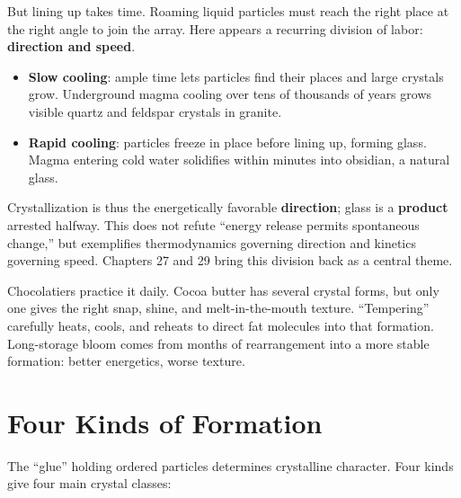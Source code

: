 But lining up takes time. Roaming liquid particles must reach the right place at the right angle to join the array. Here appears a recurring division of labor: \textbf{direction and speed}.

\begin{itemize}[itemsep=2pt]
\item \textbf{Slow cooling}: ample time lets particles find their places and large crystals grow. Underground magma cooling over tens of thousands of years grows visible quartz and feldspar crystals in granite.
\item \textbf{Rapid cooling}: particles freeze in place before lining up, forming glass. Magma entering cold water solidifies within minutes into obsidian, a natural glass.
\end{itemize}

Crystallization is thus the energetically favorable \textbf{direction}; glass is a \textbf{product} arrested halfway. This does not refute ``energy release permits spontaneous change,'' but exemplifies thermodynamics governing direction and kinetics governing speed. Chapters 27 and 29 bring this division back as a central theme.

Chocolatiers practice it daily. Cocoa butter has several crystal forms, but only one gives the right snap, shine, and melt-in-the-mouth texture. ``Tempering'' carefully heats, cools, and reheats to direct fat molecules into that formation. Long-storage bloom comes from months of rearrangement into a more stable formation: better energetics, worse texture.

\section{Four Kinds of Formation}

The ``glue'' holding ordered particles determines crystalline character. Four kinds give four main crystal classes:

